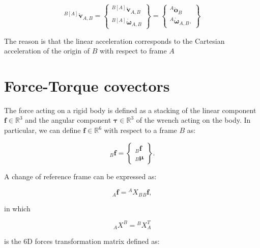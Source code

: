     \begin{equation}
    {}^{B[A]}\dot{ \mathbf{v}}_{A,B} = \begin{Bmatrix}
    {}^{B[A]}\dot{\bm{v}}_{A,B} \\
    {}^{B[A]}\dot{\bm{\omega}}_{A,B}
    \end{Bmatrix} = \begin{Bmatrix}
    {}^{A}  {\ddot{\mathbf{o}}}_{B} \\
    {}^{A}\dot{\bm{\omega}}_{A,B}.
    \end{Bmatrix}
    \label{eq: Mixed apparent acceleration}
    \end{equation}

    The reason is that the linear acceleration corresponds to the Cartesian acceleration of the origin of $B$ with respect to frame $A$

    \section{Force-Torque covectors}
    \label{sec:Force-Torque covectors}
    
    The force acting on a rigid body is defined as a stacking of the linear component $\bm{f} \in \mathbb{R}^{3}$ and the angular component $ \bm{\tau} \in \mathbb{R}^{3}$ of the wrench acting on the body. In particular, we can define $ \mathbf{f} \in \mathbb{R}^6$ with respect to a frame $B$ as:

    \begin{equation}
    {}_{B} \mathbf{f} = 
    \begin{Bmatrix}
    {}_{B}\bm{f} \\
    {}_{B}\bm{\mu}
    \end{Bmatrix}.
    \label{eq: Wrench definition}
    \end{equation}

    A change of reference frame can be expressed as:

    \begin{equation}
    {}_{A} \mathbf{f} = {}^{A} {X}_{B} {}_{B} \mathbf{f},
    \end{equation}

    in which

    \begin{equation}
    {}_{A} {X}^{B} = {}^{B} {X}_{A}^{T}
    \label{eq: Forces transformation matrix}
    \end{equation}
    
    is the 6D forces transformation matrix defined as:

